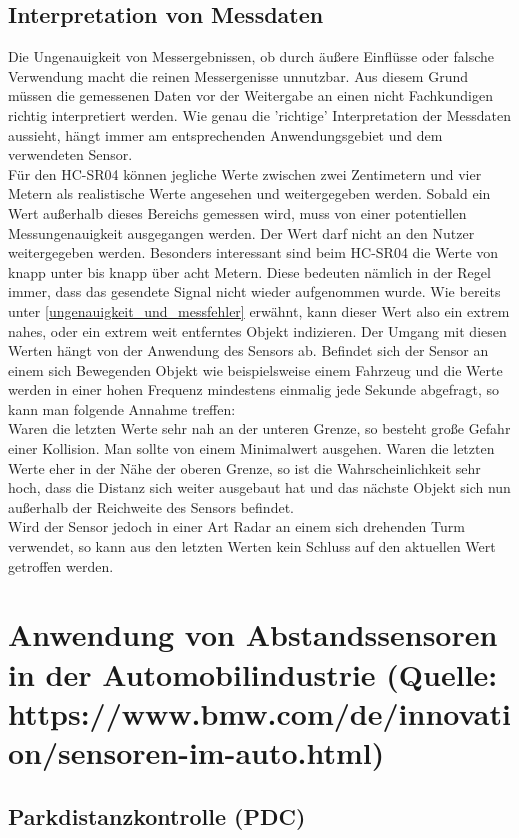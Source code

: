 \subsection{Interpretation von Messdaten}
Die Ungenauigkeit von Messergebnissen, ob durch äußere Einflüsse oder falsche Verwendung macht die reinen Messergenisse unnutzbar. Aus diesem Grund müssen die gemessenen Daten vor der Weitergabe an einen nicht Fachkundigen richtig interpretiert werden. Wie genau die 'richtige' Interpretation der Messdaten aussieht, hängt immer am entsprechenden Anwendungsgebiet und dem verwendeten Sensor.\\
Für den HC-SR04 können jegliche Werte zwischen zwei Zentimetern und vier Metern als realistische Werte angesehen und weitergegeben werden. Sobald ein Wert außerhalb dieses Bereichs gemessen wird, muss von einer potentiellen Messungenauigkeit ausgegangen werden. Der Wert darf nicht an den Nutzer weitergegeben werden. Besonders interessant sind beim HC-SR04 die Werte von knapp unter bis knapp über acht Metern. Diese bedeuten nämlich in der Regel immer, dass das gesendete Signal nicht wieder aufgenommen wurde. Wie bereits unter \ref{ungenauigkeit_und_messfehler} erwähnt, kann dieser Wert also ein extrem nahes, oder ein extrem weit entferntes Objekt indizieren. Der Umgang mit diesen Werten hängt von der Anwendung des Sensors ab. Befindet sich der Sensor an einem sich Bewegenden Objekt wie beispielsweise einem Fahrzeug und die Werte werden in einer hohen Frequenz mindestens einmalig jede Sekunde abgefragt, so kann man folgende Annahme treffen:\\
Waren die letzten Werte sehr nah an der unteren Grenze, so besteht große Gefahr einer Kollision. Man sollte von einem Minimalwert ausgehen. Waren die letzten Werte eher in der Nähe der oberen Grenze, so ist die Wahrscheinlichkeit sehr hoch, dass die Distanz sich weiter ausgebaut hat und das nächste Objekt sich nun außerhalb der Reichweite des Sensors befindet.\\
Wird der Sensor jedoch in einer Art Radar an einem sich drehenden Turm verwendet, so kann aus den letzten Werten kein Schluss auf den aktuellen Wert getroffen werden.

\section{Anwendung von Abstandssensoren in der Automobilindustrie (Quelle: https://www.bmw.com/de/innovation/sensoren-im-auto.html)}
\subsection{Parkdistanzkontrolle (PDC)}
